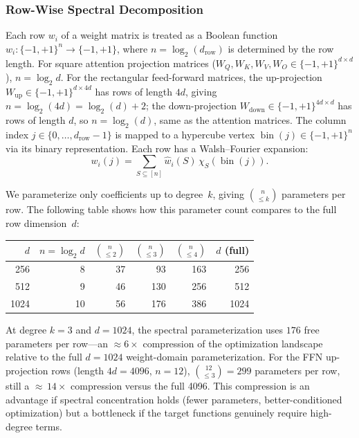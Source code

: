 \documentclass[12pt,a4paper]{article}
\theoremstyle{plain}
\theoremstyle{definition}
\theoremstyle{remark}
\newcommand{\pmone}{\{-1,+1\}}
\newcommand{\what}{\widehat{w}}
\DeclareMathOperator{\bin}{bin}
\begin{document}
\subsubsection{Row-Wise Spectral Decomposition}

Each row $w_i$ of a weight matrix is treated as a Boolean function $w_i \colon \pmone^n \to \pmone$, where $n = \log_2(d_{\text{row}})$ is determined by the row length. For square attention projection matrices ($W_Q, W_K, W_V, W_O \in \pmone^{d \times d}$), $n = \log_2 d$. For the rectangular feed-forward matrices, the up-projection $W_{\text{up}} \in \pmone^{d \times 4d}$ has rows of length $4d$, giving $n = \log_2(4d) = \log_2(d) + 2$; the down-projection $W_{\text{down}} \in \pmone^{4d \times d}$ has rows of length $d$, so $n = \log_2(d)$, same as the attention matrices. The column index $j \in \{0, \ldots, d_{\text{row}}-1\}$ is mapped to a hypercube vertex $\bin(j) \in \pmone^n$ via its binary representation. Each row has a Walsh--Fourier expansion:
\begin{equation}\label{eq:row-spectral}
    w_i(j) = \sum_{S \subseteq [n]} \what_i(S)\, \chi_S(\bin(j)).
\end{equation}

We parameterize only coefficients up to degree~$k$, giving $\binom{n}{\leq k}$ parameters per row. The following table shows how this parameter count compares to the full row dimension~$d$:

\begin{center}
\begin{tabular}{@{} r r r r r r @{}}
\toprule
$d$ & $n = \log_2 d$ & $\binom{n}{\leq 2}$ & $\binom{n}{\leq 3}$ & $\binom{n}{\leq 4}$ & $d$ (full) \\
\midrule
256 & 8 & 37 & 93 & 163 & 256 \\
512 & 9 & 46 & 130 & 256 & 512 \\
1024 & 10 & 56 & 176 & 386 & 1024 \\
\bottomrule
\end{tabular}
\end{center}
At degree $k = 3$ and $d = 1024$, the spectral parameterization uses $176$ free parameters per row---an $\approx 6\times$ compression of the optimization landscape relative to the full $d = 1024$ weight-domain parameterization. For the FFN up-projection rows (length $4d = 4096$, $n = 12$), $\binom{12}{\leq 3} = 299$ parameters per row, still a ${\approx}\,14\times$ compression versus the full 4096. This compression is an advantage if spectral concentration holds (fewer parameters, better-conditioned optimization) but a bottleneck if the target functions genuinely require high-degree terms.
\end{document}
